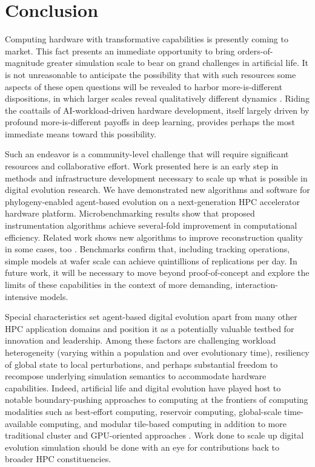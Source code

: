\section{Conclusion} \label{sec:conclusion}

Computing hardware with transformative capabilities is presently coming to market.
This fact presents an immediate opportunity to bring orders-of-magnitude greater simulation scale to bear on grand challenges in artificial life.
It is not unreasonable to anticipate the possibility that with such resources some aspects of these open questions will be revealed to harbor more-is-different dispositions, in which larger scales reveal qualitatively different dynamics \citep{anderson1972more}.
Riding the coattails of AI-workload-driven hardware development, itself largely driven by profound more-is-different payoffs in deep learning, provides perhaps the most immediate means toward this possibility.

Such an endeavor is a community-level challenge that will require significant resources and collaborative effort.
Work presented here is an early step in methods and infrastructure development necessary to scale up what is possible in digital evolution research.
We have demonstrated new algorithms and software for phylogeny-enabled agent-based evolution on a next-generation HPC accelerator hardware platform.
Microbenchmarking results show that proposed instrumentation algorithms achieve several-fold improvement in computational efficiency.
Related work shows new algorithms to improve reconstruction quality in some cases, too \citep{moreno2024guide}.
Benchmarks confirm that, including tracking operations, simple models at wafer scale can achieve quintillions of replications per day.
In future work, it will be necessary to move beyond proof-of-concept and explore the limits of these capabilities in the context of more demanding, interaction-intensive models.

Special characteristics set agent-based digital evolution apart from many other HPC application domains and position it as a potentially valuable testbed for innovation and leadership.
Among these factors are challenging workload heterogeneity (varying within a population and over evolutionary time), resiliency of global state to local perturbations, and perhaps substantial freedom to recompose underlying simulation semantics to accommodate hardware capabilities.
Indeed, artificial life and digital evolution have played host to notable boundary-pushing approaches to computing at the frontiers of computing modalities such as best-effort computing, reservoir computing, global-scale time-available computing, and modular tile-based computing in addition to more traditional cluster and GPU-oriented approaches \citep{moreno2021conduit,ackley2020best,ackley2023robust,heinemann2008artificial,miikkulainen2024evolving,ray1995proposal}.
Work done to scale up digital evolution simulation should be done with an eye for contributions back to broader HPC constituencies.

